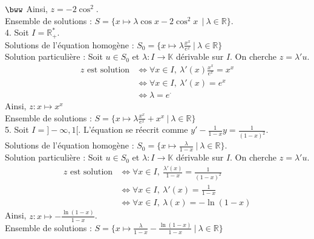 \documentclass[11pt]{article}
\begin{document}
\begin{exercice}{$\bww$}{}
    Ainsi, $z=-2\cos^2$.\\
    Ensemble de solutions : $S = \{x\mapsto \lambda\cos x - 2\cos^2x\ ~ | ~ \lambda \in \mathbb{R}\}$.\\
    4. Soit $I=\mathbb{R}^*_+$.\\
    Solutions de l'équation homogène : $S_0=\{x\mapsto\lambda \frac{x^x}{e^x} ~ | ~ \lambda \in\mathbb{R}\}$\\
    Solution particulière : Soit $u\in S_0$ et $\lambda : I \rightarrow \mathbb{K}$ dérivable sur $I$. On cherche $z=\lambda'u$.
    \begin{align*}
        z \text{ est solution} &\iff \forall{x\in I}, ~ \lambda'(x)\frac{x^x}{e^x} = x^x\\
        &\iff \forall{x \in I}, ~ \lambda'(x) = e^x\\
        &\iff \lambda = e^\cdot
    \end{align*}
    Ainsi, $z:x \mapsto x^x$\\
    Ensemble de solutions : $S = \{x\mapsto \lambda\frac{x^x}{e^x} + x^x ~ | ~ \lambda \in \mathbb{R}\}$\\
    5. Soit $I=]-\infty,1[$. L'équation se réecrit comme $y' - \frac{1}{1-x}y = \frac{1}{(1-x)^2}$.\\
    Solutions de l'équation homogène : $S_0 = \{x\mapsto\frac{\lambda}{1-x} ~ | ~ \lambda\in\mathbb{R}\}$.\\
    Solution particulière : Soit $u\in S_0$ et $\lambda:I\rightarrow\mathbb{K}$ dérivable sur $I$. On cherche $z=\lambda'u$.
    \begin{align*}
        z \text{ est solution} &\iff \forall{x\in I}, ~ \frac{\lambda'(x)}{1-x} = \frac{1}{(1-x)^2}\\
        &\iff \forall{x\in I}, ~ \lambda'(x) = \frac{1}{1-x}\\
        &\iff \forall{x\in I}, ~ \lambda(x) = -\ln(1-x) 
    \end{align*} 
    Ainsi, $z:x\mapsto -\frac{\ln(1-x)}{1-x}$.\\
    Ensemble de solutions : $S = \{x \mapsto \frac{\lambda}{1-x} - \frac{\ln(1-x)}{1-x} ~ | ~ \lambda \in \mathbb{R}\}$
\end{exercice}

\pagebreak
\end{document}
